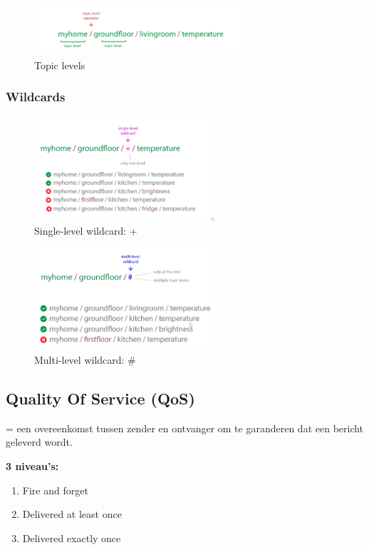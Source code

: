 \documentclass{article}
\newcommand{\bold}[1]{\textbf{#1}}
\begin{document}
\begin{figure}[H]
    \centering
    \includegraphics[width=0.7\textwidth]{mqtt-topics.png}
    \caption{Topic levels}
\end{figure}

\subsubsection{Wildcards}

\begin{figure}[H]
    \centering
    \includegraphics[width=0.6\textwidth]{mqtt-wildcards.png}
    \caption{Single-level wildcard: +}
\end{figure}


\begin{figure}[H]
    \centering
    \includegraphics[width=0.6\textwidth]{mqtt-wildcards2.png}
    \caption{Multi-level wildcard: \#}
\end{figure}

\subsection{Quality Of Service (QoS)}
= een overeenkomst tussen zender en ontvanger om te garanderen dat een bericht geleverd wordt.

\bold{3 niveau's:}
\begin{enumerate}
    \item Fire and forget
    \item Delivered at least once
    \item Delivered exactly once
\end{enumerate}
\end{document}
